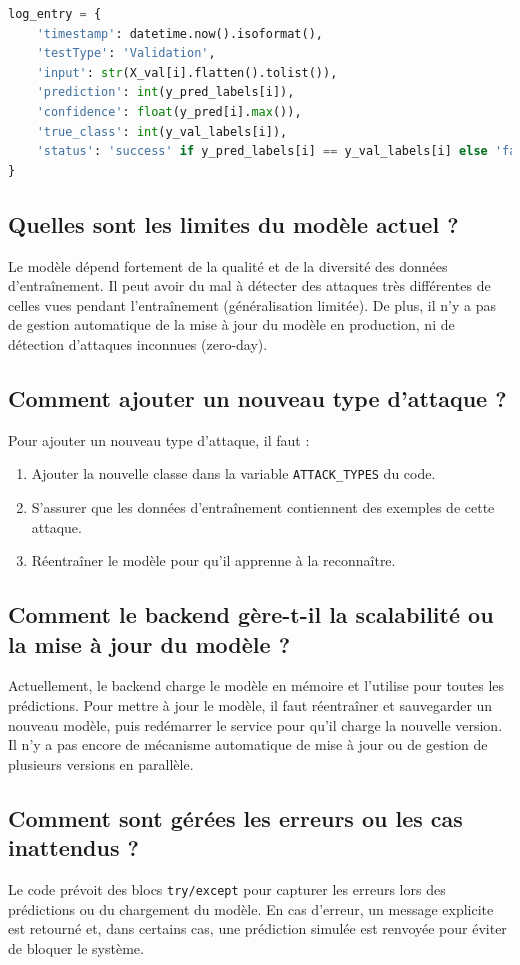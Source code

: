 \documentclass[a4paper,12pt]{article}
\begin{document}
\begin{lstlisting}[language=Python]
log_entry = {
    'timestamp': datetime.now().isoformat(),
    'testType': 'Validation',
    'input': str(X_val[i].flatten().tolist()),
    'prediction': int(y_pred_labels[i]),
    'confidence': float(y_pred[i].max()),
    'true_class': int(y_val_labels[i]),
    'status': 'success' if y_pred_labels[i] == y_val_labels[i] else 'fail'
}
\end{lstlisting}

\subsection{Quelles sont les limites du modèle actuel ?}
Le modèle dépend fortement de la qualité et de la diversité des données d'entraînement. Il peut avoir du mal à détecter des attaques très différentes de celles vues pendant l'entraînement (généralisation limitée). De plus, il n'y a pas de gestion automatique de la mise à jour du modèle en production, ni de détection d'attaques inconnues (zero-day).

\subsection{Comment ajouter un nouveau type d'attaque ?}
Pour ajouter un nouveau type d'attaque, il faut :
\begin{enumerate}
  \item Ajouter la nouvelle classe dans la variable \texttt{ATTACK\_TYPES} du code.
  \item S'assurer que les données d'entraînement contiennent des exemples de cette attaque.
  \item Réentraîner le modèle pour qu'il apprenne à la reconnaître.
\end{enumerate}

\subsection{Comment le backend gère-t-il la scalabilité ou la mise à jour du modèle ?}
Actuellement, le backend charge le modèle en mémoire et l'utilise pour toutes les prédictions. Pour mettre à jour le modèle, il faut réentraîner et sauvegarder un nouveau modèle, puis redémarrer le service pour qu'il charge la nouvelle version. Il n'y a pas encore de mécanisme automatique de mise à jour ou de gestion de plusieurs versions en parallèle.

\subsection{Comment sont gérées les erreurs ou les cas inattendus ?}
Le code prévoit des blocs \texttt{try/except} pour capturer les erreurs lors des prédictions ou du chargement du modèle. En cas d'erreur, un message explicite est retourné et, dans certains cas, une prédiction simulée est renvoyée pour éviter de bloquer le système.
\end{document}
